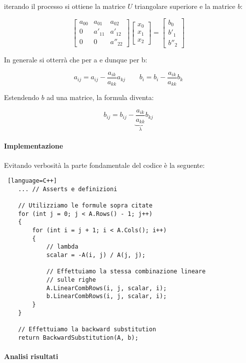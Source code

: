 iterando il processo si ottiene la matrice $U$ triangolare superiore e la matrice $b$:

$$
	\begin{bmatrix}
		a_{00} & a_{01}  & a_{02}   \\
		0      & a'_{11} & a'_{12}  \\
		0      & 0       & a''_{22}
	\end{bmatrix} \begin{bmatrix}
		x_0 \\ x_1 \\ x_2 \end{bmatrix} = \begin{bmatrix}
		b_0 \\ b'_1 \\ b''_2 \end{bmatrix}
$$

In generale si otterrà che per a e dunque per b:

$$
	a_{ij} = a_{ij} - \frac{a_{ik}}{a_{kk}} a_{kj} \quad \quad b_i = b_i - \frac{a_{ik}}{a_{kk}} b_k
$$

Estendendo $b$ ad una matrice, la formula diventa:

$$
	b_{ij} = b_{ij} - \underbrace{\frac{a_{ik}}{a_{kk}}}_{\lambda} b_{kj}
$$

\paragraph{Implementazione}

Evitando verbosità la parte fondamentale del codice è la seguente:

\begin{lstlisting} [language=C++]
    ... // Asserts e definizioni

    // Utilizziamo le formule sopra citate
    for (int j = 0; j < A.Rows() - 1; j++)
    {
        for (int i = j + 1; i < A.Cols(); i++)
        {
            // lambda
            scalar = -A(i, j) / A(j, j);

            // Effettuiamo la stessa combinazione lineare 
            // sulle righe 
            A.LinearCombRows(i, j, scalar, i);
            b.LinearCombRows(i, j, scalar, i);
        }
    }

    // Effettuiamo la backward substitution
    return BackwardSubstitution(A, b);
\end{lstlisting}

\paragraph{Analisi risultati}

